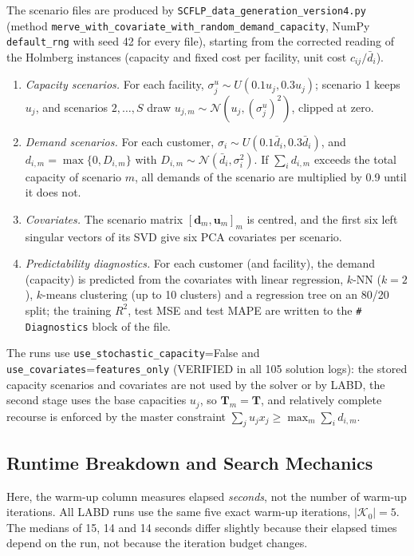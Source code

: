 The scenario files are produced by \texttt{SCFLP\_data\_generation\_version4.py} (method \texttt{merve\_with\_covariate\_with\_random\_demand\_capacity}, NumPy \texttt{default\_rng} with seed 42 for every file), starting from the corrected reading of the Holmberg instances (capacity and fixed cost per facility, unit cost $c_{ij}/\bar d_i$).
\begin{enumerate}
\item \emph{Capacity scenarios.} For each facility, $\sigma^u_j\sim U(0.1u_j,0.3u_j)$; scenario 1 keeps $u_j$, and scenarios $2,\dots,S$ draw $u_{j,m}\sim\mathcal N(u_j,(\sigma^u_j)^2)$, clipped at zero.
\item \emph{Demand scenarios.} For each customer, $\sigma_i\sim U(0.1\bar d_i,0.3\bar d_i)$, and $d_{i,m}=\max\{0,D_{i,m}\}$ with $D_{i,m}\sim\mathcal N(\bar d_i,\sigma_i^2)$. If $\sum_i d_{i,m}$ exceeds the total capacity of scenario $m$, all demands of the scenario are multiplied by 0.9 until it does not.
\item \emph{Covariates.} The scenario matrix $[\mathbf d_m,\mathbf u_m]_{m}$ is centred, and the first six left singular vectors of its SVD give six PCA covariates per scenario.
\item \emph{Predictability diagnostics.} For each customer (and facility), the demand (capacity) is predicted from the covariates with linear regression, $k$-NN ($k=2$), $k$-means clustering (up to 10 clusters) and a regression tree on an 80/20 split; the training $R^2$, test MSE and test MAPE are written to the \texttt{\# Diagnostics} block of the file.
\end{enumerate}
The runs use \texttt{use\_stochastic\_capacity}=False and \texttt{use\_covariates}=\texttt{features\_only} (VERIFIED in all 105 solution logs): the stored capacity scenarios and covariates are not used by the solver or by LABD, the second stage uses the base capacities $u_j$, so $\mathbf T_m=\mathbf T$, and relatively complete recourse is enforced by the master constraint $\sum_ju_jx_j\ge\max_m\sum_id_{i,m}$.

\subsection{Runtime Breakdown and Search Mechanics}\label{app:runstats}

Here, the warm-up column measures elapsed \emph{seconds}, not the number of warm-up iterations. All LABD runs use the same five exact warm-up iterations, $|\mathcal K_0|=5$. The medians of 15, 14 and 14 seconds differ slightly because their elapsed times depend on the run, not because the iteration budget changes.

